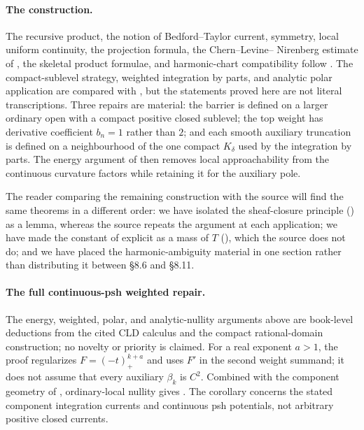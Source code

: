 \paragraph{The construction.}
The recursive product, the notion of Bedford--Taylor current, symmetry,
local uniform continuity, the projection formula, the Chern--Levine--%
Nirenberg estimate of , the skeletal product formulae, and
harmonic-chart compatibility follow
\cite[\S\S8.1--8.12]{CLD25}.  The compact-sublevel strategy, weighted
integration by parts, and analytic polar application are compared with
\cite[\S8.4 and \S16.9]{CLD25}, but the statements proved here are not
literal transcriptions.  Three repairs are material: the barrier is defined
on a larger ordinary open with a compact positive closed sublevel; the top
weight has derivative coefficient $b_n=1$ rather than $2$; and each smooth
auxiliary truncation is defined on a neighbourhood of the one compact
$K_\delta$ used by the integration by parts.  The energy argument of
 then removes local approachability from the
continuous curvature factors while retaining it for the auxiliary pole.

The reader comparing the remaining construction with the source will find
the same theorems in a different order: we have isolated the sheaf-closure principle
() as a lemma, whereas the source repeats the
argument at each application; we have made the constant of
 explicit as a mass of $T$
(), which the source does not do; and we have
placed the harmonic-ambiguity material in one section rather than
distributing it between \S8.6 and \S8.11.

\paragraph{The full continuous-psh weighted repair.}
The energy, weighted, polar, and analytic-nullity arguments above are
book-level deductions from the cited CLD calculus and the compact
rational-domain construction; no novelty or priority is claimed.  For a
real exponent $a>1$, the proof regularizes $F=(-t)_+^{k+a}$ and uses $F'$ in
the second weight summand; it does not assume that every auxiliary
$\beta_k$ is $C^2$.  Combined with the component geometry of
, ordinary-local nullity gives
.  The corollary concerns the stated
component integration currents and continuous psh potentials, not arbitrary
positive closed currents.

